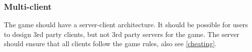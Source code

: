 

\subsubsection{Multi-client}
The game should have a server-client architecture. It should be possible for users to design 3rd party clients, but not 3rd party servers for the game. The server should ensure that all clients follow the game rules, also see \ref{cheating}.


\newpage
